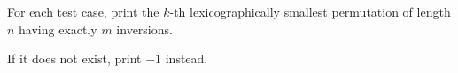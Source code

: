 For each test case, print the $k$-th lexicographically smallest permutation of length $n$ having exactly $m$ inversions.

If it does not exist, print $-1$ instead.
